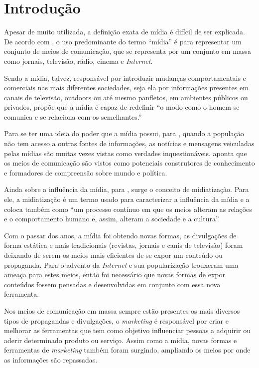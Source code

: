 \chapter[Introdução]{Introdução}
Apesar de muito utilizada, a definição exata de mídia é difícil de ser explicada. De acordo com \cite[p.49]{guazina2007}, o uso predominante do termo ``mídia'' é para representar um conjunto de meios de comunicação, que se representa por um conjunto em massa como jornais, televisão, rádio, cinema e \textit{Internet}.

Sendo a mídia, talvez, responsável por introduzir mudanças comportamentais e comerciais nas mais diferentes sociedades, seja ela por informações presentes em canais de televisão, outdoors ou até mesmo panfletos, em ambientes públicos ou privados, \cite[p.3]{escobar2007} propõe que a mídia é capaz de redefinir ``o modo como o homem se comunica e se relaciona com os semelhantes.''

Para se ter uma ideia do poder que a mídia possui, para \cite{silva2007}, quando a população não tem acesso a outras fontes de informações, as notícias e mensagens veiculadas pelas mídias são muitas vezes vistas como verdades inquestionáveis. \cite[p.53]{guazina2007} aponta que os meios de comunicação são vistos como potenciais construtores de conhecimento e formadores de compreensão sobre mundo e política.

Ainda sobre a influência da mídia, para \cite[p.54]{hjarvard2012}, surge o conceito de midiatização. Para ele, a midiatização é um termo usado para caracterizar a influência da mídia e a coloca também como ``um processo contínuo em que os meios alteram as relações e o comportamento humano e, assim, alteram a sociedade e a cultura''. 

Com o passar dos anos, a mídia foi obtendo novas formas, as divulgações de forma estática e mais tradicionais (revistas, jornais e canis de televisão) foram deixando de serem os meios mais eficientes de se expor um conteúdo ou propaganda. Para \cite{meditsch2001} o advento da \textit{Internet} e sua popularização trouxeram uma ameaça para estes meios, então foi necessário que novas formas de expor conteúdos fossem pensadas e desenvolvidas em conjunto com essa nova ferramenta.

Nos meios de comunicação em massa sempre estão presentes os mais diversos tipos de propagandas e divulgações, o \textit{marketing} é responsável por criar e melhorar as ferramentas que tem como objetivo influenciar pessoas a adquirir ou aderir determinado produto ou serviço. Assim como a mídia, novas formas e ferramentas de \textit{marketing} também foram surgindo, ampliando os meios por onde as informações são repassadas. 

